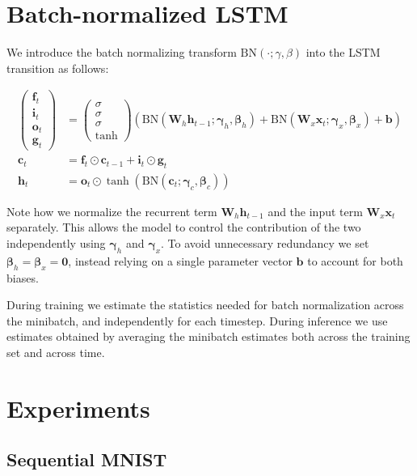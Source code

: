 \documentclass{article} %
\newcommand{\vect}[1]{\mathbf{#1}}
\newcommand{\mat}[1]{\mathbf{#1}}
\newcommand{\ewprod}{\odot}
\begin{document}
\section{Batch-normalized LSTM}

We introduce the batch normalizing transform $\mathrm{BN}(\cdot; \gamma, \beta)$ into the LSTM transition as follows:

\begin{align}
\left(\begin{array}{ccc}
\vect{f}_t \\
\vect{i}_t \\
\vect{o}_t \\
\vect{g}_t
\end{array}\right)
 &=
\left(\begin{array}{ccc}
\sigma \\
\sigma \\
\sigma \\
\tanh
\end{array}\right)
\left(
 \mathrm{BN} (\mat{W}_h \vect{h}_{t-1}; \vect{\gamma}_h, \vect{\beta}_h) +
 \mathrm{BN} (\mat{W}_x \vect{x}_t    ; \vect{\gamma}_x, \vect{\beta}_x) +
 \vect{b}
\right) \\
\vect{c}_t &= \vect{f}_t \ewprod \vect{c}_{t-1} +
              \vect{i}_t \ewprod \vect{g}_t \\
\vect{h}_t &= \vect{o}_t \ewprod \tanh(
 \mathrm{BN} (\vect{c}_t; \vect{\gamma}_c, \vect{\beta}_c)
)
\end{align}

Note how we normalize the recurrent term $\mat{W}_h \vect{h}_{t-1}$ and the input term $\mat{W}_x \vect{x}_t$ separately.
This allows the model to control the contribution of the two independently using $\vect{\gamma}_h$ and $\vect{\gamma}_x$.
To avoid unnecessary redundancy we set $\vect{\beta}_h = \vect{\beta}_x = \vect{0}$, instead relying on a single parameter vector $\vect{b}$ to account for both biases.

During training we estimate the statistics needed for batch normalization across the minibatch, and independently for each timestep.
During inference we use estimates obtained by averaging the minibatch estimates both across the training set and across time.

\section{Experiments}

\subsection{Sequential MNIST}
\end{document}
